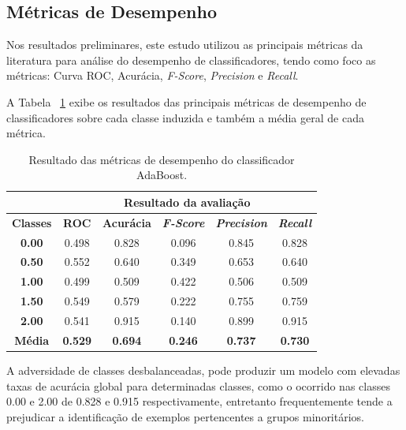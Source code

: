 \subsection{Métricas de Desempenho}

Nos resultados preliminares, este estudo utilizou as principais métricas da literatura para análise do desempenho de classificadores, tendo como foco as métricas: Curva ROC, Acurácia, \textit{F-Score}, \textit{Precision} e \textit{Recall}.

A Tabela ~\ref{tab:evaluation_result} exibe os resultados das principais métricas de desempenho de classificadores sobre cada classe induzida e também a média geral de cada métrica.

\begin{table}[H]
\centering
\begin{tabular}{c|c|c|c|c|c|}
\cline{2-6}
 & \multicolumn{5}{c|}{\textbf{Resultado da avaliação}} \\ \hline
\multicolumn{1}{|c|}{\textbf{Classes}} & \textbf{ROC} & \textbf{Acurácia} & \textit{\textbf{F-Score}} & \textit{\textbf{Precision}} & \textit{\textbf{Recall}} \\ \hline
\multicolumn{1}{|c|}{\textbf{0.00}}  & 0.498 & 0.828 & 0.096 & 0.845 & 0.828 \\ \hline
\multicolumn{1}{|c|}{\textbf{0.50}}  & 0.552 & 0.640 & 0.349 & 0.653 & 0.640 \\ \hline
\multicolumn{1}{|c|}{\textbf{1.00}}  & 0.499 & 0.509 & 0.422 & 0.506 & 0.509 \\ \hline
\multicolumn{1}{|c|}{\textbf{1.50}}  & 0.549 & 0.579 & 0.222 & 0.755 & 0.759 \\ \hline
\multicolumn{1}{|c|}{\textbf{2.00}}  & 0.541 & 0.915 & 0.140 & 0.899 & 0.915 \\ \hline
\multicolumn{1}{|c|}{\textbf{Média}} & \textbf{0.529} & \textbf{0.694} & \textbf{0.246} & \textbf{0.737} & \textbf{0.730} \\ \hline
\end{tabular}
\caption{Resultado das métricas de desempenho do classificador AdaBoost.}
\label{tab:evaluation_result}
\end{table}

A adversidade de classes desbalanceadas, pode produzir um modelo com elevadas taxas de acurácia global para determinadas classes, como o ocorrido nas classes 0.00 e 2.00 de 0.828 e 0.915 respectivamente, entretanto frequentemente tende a prejudicar a identificação de exemplos pertencentes a grupos minoritários.

